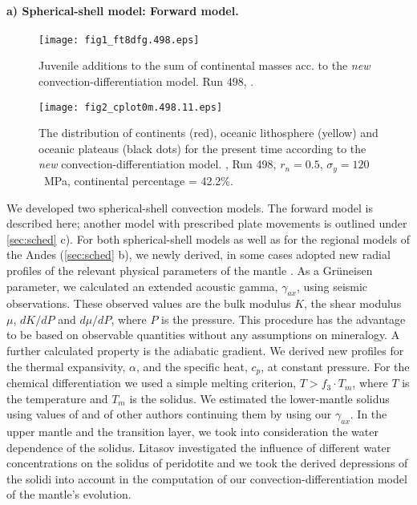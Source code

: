 \documentclass[twoside,10pt]{article}
\begin{document}
\paragraph{a) Spherical-shell model: Forward model.}
\begin{SCfigure}[1][htb!]
\centering
\texttt{[image: fig1\_ft8dfg.498.eps]}
\caption{Juvenile additions to the sum of continental masses acc. to the \emph{new} convection-differentiation model.
 Run 498, \cite{Walzer2012b}.}
 \label{fig:1}
\end{SCfigure}
\begin{SCfigure}[1][htb!]
\texttt{[image: fig2\_cplot0m.498.11.eps]}
\caption{The distribution of continents (red), oceanic lithosphere (yellow) and oceanic plateaus (black dots) for the present time according to the \emph{new} convection-differentiation model.
 \cite{Walzer2012b}, Run 498, $r_n=0.5$, $\sigma_y=120$~MPa, continental percentage = 42.2\%.}
 \label{fig:2}
\end{SCfigure}
We developed two spherical-shell convection models. 
The forward model is described here; another model with prescribed plate movements is outlined under \ref{sec:sched} c). 
For both spherical-shell models as well as for the regional models of the Andes (\ref{sec:sched} b), we newly derived, in some cases adopted new radial profiles of the relevant physical parameters of the mantle \cite{Walzer2012b}. 
As a Gr\"uneisen parameter, we calculated an extended acoustic gamma, $\gamma_{ax}$, using seismic observations.
These observed values are the bulk modulus $K$, the shear modulus $\mu$, $dK / dP$ and $d\mu / dP$, where $P$ is the pressure.
This procedure has the advantage to be based on observable quantities without any assumptions on mineralogy.
A further calculated property is the adiabatic gradient. 
We derived new profiles for the thermal expansivity, $\alpha$, and the specific heat, $c_p$, at constant pressure.
For the chemical differentiation we used a simple melting criterion, $T > f_3 \cdot T_m$, where $T$ is the temperature and $T_m$ is the solidus.
We estimated the lower-mantle solidus using values of \cite{Litasov2002} and of other authors continuing them by using our $\gamma_{ax}$.
In the upper mantle and the transition layer, we took into consideration the water dependence of the solidus.
Litasov \cite{Litasov2011} investigated the influence of different water concentrations on the solidus of peridotite and we took the derived depressions of the solidi into account in the computation of our convection-differentiation model of the mantle's evolution.
\end{document}
